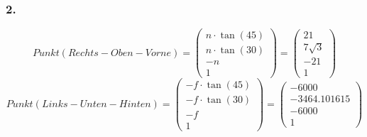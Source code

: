 \documentclass{article}
\begin{document}
\subsubsection*{2.}
\[Punkt(Rechts-Oben-Vorne)=
    \begin{pmatrix}
        n\cdot \tan(45) \\
        n\cdot \tan(30) \\
        -n              \\
        1
    \end{pmatrix}=
    \begin{pmatrix}
        21        \\
        7\sqrt{3} \\
        -21       \\
        1
    \end{pmatrix}
\]
\[
    Punkt(Links-Unten-Hinten)=
    \begin{pmatrix}
        -f\cdot \tan(45) \\
        -f\cdot\tan(30)  \\
        -f               \\
        1
    \end{pmatrix}=
    \begin{pmatrix}
        -6000        \\
        -3464.101615 \\
        -6000        \\
        1
    \end{pmatrix}
\]
\end{document}

